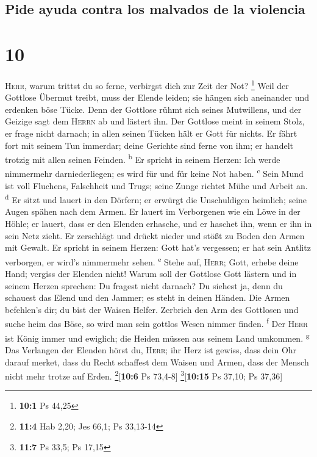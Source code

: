 \hypertarget{pide-ayuda-contra-los-malvados-de-la-violencia}{%
\subsection{Pide ayuda contra los malvados de la
violencia}\label{pide-ayuda-contra-los-malvados-de-la-violencia}}

\hypertarget{section-9}{%
\section{10}\label{section-9}}

 \textsc{Herr}, warum trittst du so ferne, verbirgst dich
zur Zeit der Not? \footnote{\textbf{10:1} Ps 44,25}  Weil
der Gottlose Übermut treibt, muss der Elende leiden; sie hängen sich
aneinander und erdenken böse Tücke.  Denn der Gottlose
rühmt sich seines Mutwillens, und der Geizige sagt dem \textsc{Herrn} ab
und lästert ihn.  Der Gottlose meint in seinem Stolz, er
frage nicht darnach; in allen seinen Tücken hält er Gott für nichts.
 Er fährt fort mit seinem Tun immerdar; deine Gerichte
sind ferne von ihm; er handelt trotzig mit allen seinen Feinden.
\textsuperscript{b}  Er spricht in seinem Herzen: Ich
werde nimmermehr darniederliegen; es wird für und für keine Not haben.
\textsuperscript{c}  Sein Mund ist voll Fluchens,
Falschheit und Trugs; seine Zunge richtet Mühe und Arbeit an.
\textsuperscript{d}  Er sitzt und lauert in den Dörfern;
er erwürgt die Unschuldigen heimlich; seine Augen spähen nach dem Armen.
 Er lauert im Verborgenen wie ein Löwe in der Höhle; er
lauert, dass er den Elenden erhasche, und er haschet ihn, wenn er ihn in
sein Netz zieht.  Er zerschlägt und drückt nieder und
stößt zu Boden den Armen mit Gewalt.  Er spricht in
seinem Herzen: Gott hat's vergessen; er hat sein Antlitz verborgen, er
wird's nimmermehr sehen. \textsuperscript{e}  Stehe auf,
\textsc{Herr}; Gott, erhebe deine Hand; vergiss der Elenden nicht!
 Warum soll der Gottlose Gott lästern und in seinem
Herzen sprechen: Du fragest nicht darnach?  Du siehest
ja, denn du schauest das Elend und den Jammer; es steht in deinen
Händen. Die Armen befehlen's dir; du bist der Waisen Helfer.
 Zerbrich den Arm des Gottlosen und suche heim das Böse,
so wird man sein gottlos Wesen nimmer finden. \textsuperscript{f}
 Der \textsc{Herr} ist König immer und ewiglich; die
Heiden müssen aus seinem Land umkommen. \textsuperscript{g}
 Das Verlangen der Elenden hörst du, \textsc{Herr}; ihr
Herz ist gewiss, dass dein Ohr darauf merket,  dass du
Recht schaffest dem Waisen und Armen, dass der Mensch nicht mehr trotze
auf Erden. \footnote{\textbf{11:4} Hab 2,20; Jes 66,1; Ps 33,13-14}{[}\textbf{10:6}
Ps 73,4-8{]} \footnote{\textbf{11:7} Ps 33,5; Ps 17,15}{[}\textbf{10:15}
Ps 37,10; Ps 37,36{]}

